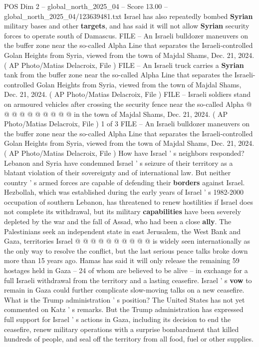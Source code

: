 \begin{textsample}{POS Dim 2 – global\_north\_2025\_04 – Score 13.00 – global\_north\_2025\_04/123639481.txt}
Israel has also repeatedly bombed \textbf{Syrian} military bases and other \textbf{targets}, and has said it will not allow \textbf{Syrian} security forces to operate south of Damascus.
FILE -- An Israeli bulldozer maneuvers on the buffer zone near the so-called Alpha Line that separates the Israeli-controlled Golan Heights from Syria, viewed from the town of Majdal Shams, Dec. 21, 2024. ( AP Photo/Matias Delacroix, File ) FILE -- An Israeli truck carries a \textbf{Syrian} tank from the buffer zone near the so-called Alpha Line that separates the Israeli-controlled Golan Heights from Syria, viewed from the town of Majdal Shams, Dec. 21, 2024. ( AP Photo/Matias Delacroix, File ) FILE -- Israeli soldiers stand on armoured vehicles after crossing the security fence near the so-called Alpha @ @ @ @ @ @ @ @ @ @ in the town of Majdal Shams, Dec. 21, 2024. ( AP Photo/Matias Delacroix, File ) 1 of 3 FILE -- An Israeli bulldozer maneuvers on the buffer zone near the so-called Alpha Line that separates the Israeli-controlled Golan Heights from Syria, viewed from the town of Majdal Shams, Dec. 21, 2024. ( AP Photo/Matias Delacroix, File ) How have Israel ' s neighbors responded?
Lebanon and Syria have condemned Israel ' s seizure of their territory as a blatant violation of their sovereignty and of international law.
But neither country ' s armed forces are capable of defending their \textbf{borders} against Israel.
Hezbollah, which was established during the early years of Israel ' s 1982-2000 occupation of southern Lebanon, has threatened to renew hostilities if Israel does not complete its withdrawal, but its military \textbf{capabilities} have been severely depleted by the war and the fall of Assad, who had been a close \textbf{ally}.
The Palestinians seek an independent state in east Jerusalem, the West Bank and Gaza, territories Israel @ @ @ @ @ @ @ @ @ @ is widely seen internationally as the only way to resolve the conflict, but the last serious peace talks broke down more than 15 years ago.
Hamas has said it will only release the remaining 59 hostages held in Gaza -- 24 of whom are believed to be alive -- in exchange for a full Israeli withdrawal from the territory and a lasting ceasefire.
Israel ' s \textbf{vow} to remain in Gaza could further complicate slow-moving talks on a new ceasefire.
What is the Trump administration ' s position?
The United States has not yet commented on Katz ' s remarks.
But the Trump administration has expressed full support for Israel ' s actions in Gaza, including its decision to end the ceasefire, renew military operations with a surprise bombardment that killed hundreds of people, and seal off the territory from all food, fuel or other supplies.

\end{textsample}
